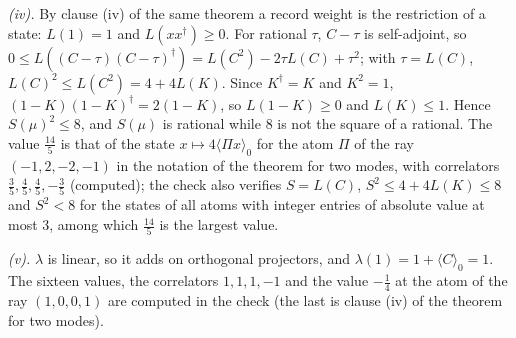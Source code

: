 \emph{(iv).} By clause (iv) of the same theorem a record weight is the restriction of a state: $L(1) = 1$ and $L(xx^{\dagger}) \ge 0$. For rational $\tau$, $C - \tau$ is self-adjoint, so $0 \le L((C - \tau)(C - \tau)^{\dagger}) = L(C^{2}) - 2\tau L(C) + \tau^{2}$; with $\tau = L(C)$, $L(C)^{2} \le L(C^{2}) = 4 + 4L(K)$. Since $K^{\dagger} = K$ and $K^{2} = 1$, $(1 - K)(1 - K)^{\dagger} = 2(1 - K)$, so $L(1 - K) \ge 0$ and $L(K) \le 1$. Hence $S(\mu)^{2} \le 8$, and $S(\mu)$ is rational while $8$ is not the square of a rational. The value $\tfrac{14}{5}$ is that of the state $x \mapsto 4\langle\Pi x\rangle_{0}$ for the atom $\Pi$ of the ray $(-1, 2, -2, -1)$ in the notation of the theorem for two modes, with correlators $\tfrac35, \tfrac45, \tfrac45, -\tfrac35$ (computed); the check also verifies $S = L(C)$, $S^{2} \le 4 + 4L(K) \le 8$ and $S^{2} < 8$ for the states of all atoms with integer entries of absolute value at most $3$, among which $\tfrac{14}{5}$ is the largest value.

\emph{(v).} $\lambda$ is linear, so it adds on orthogonal projectors, and $\lambda(1) = 1 + \langle C\rangle_{0} = 1$. The sixteen values, the correlators $1, 1, 1, -1$ and the value $-\tfrac14$ at the atom of the ray $(1, 0, 0, 1)$ are computed in the check (the last is clause (iv) of the theorem for two modes).
